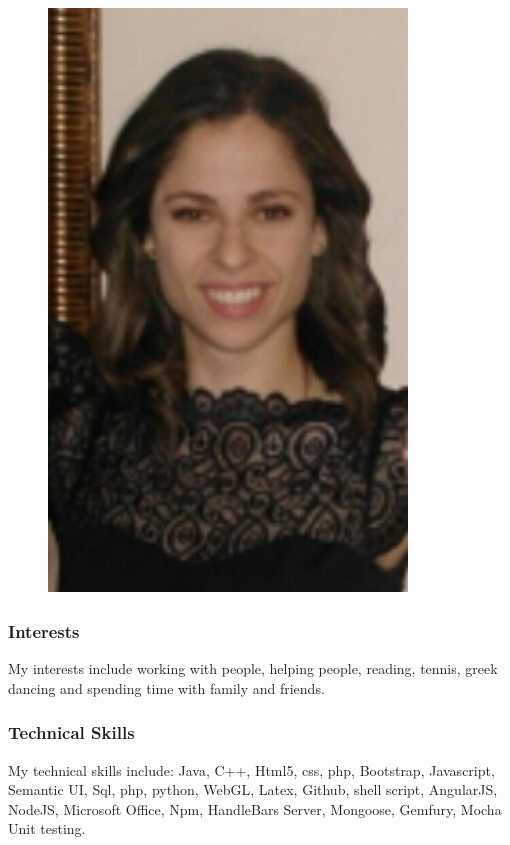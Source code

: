 \documentclass[hidelinks, 12pt, oneside]{article}
\begin{document}
\begin{figure}[h!]
  \centering
    \includegraphics[width=0.85\textwidth]{t} 
\end{figure}

\subsubsection{Interests}
My interests include working with people, helping people, reading, tennis, greek dancing and spending time with family and friends. 
\subsubsection{Technical Skills}
My technical skills include: Java, C++, Html5, css, php, Bootstrap, Javascript, Semantic UI, Sql, php, python,  WebGL, Latex, Github, shell script, AngularJS, NodeJS, Microsoft Office, Npm, HandleBars Server, Mongoose, Gemfury, Mocha Unit testing. 
\end{document}
